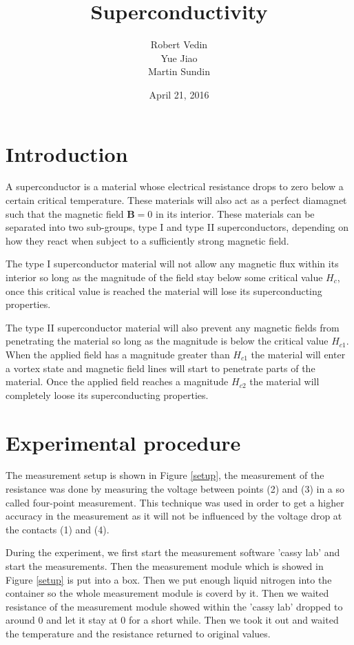 \documentclass[a4paper]{article}
\title{Superconductivity}
\author{Robert Vedin \\ Yue Jiao \\ Martin Sundin}
\date{April 21, 2016}
\begin{document}
\maketitle



\section{Introduction}

A superconductor is a material whose electrical resistance drops to zero below a certain critical temperature. These materials will also act as a perfect diamagnet such that the magnetic field $\mathbf{B} = 0$ in its interior. These materials can be separated into two sub-groups, type I and type II superconductors, depending on how they react when subject to a sufficiently strong magnetic field.

The type I superconductor material will not allow any magnetic flux within its interior so long as the magnitude of the field stay below some critical value $H_c$, once this critical value is reached the material will lose its superconducting properties.

The type II superconductor material will also prevent any magnetic fields from penetrating the material so long as the magnitude is below the critical value $H_{c1}$. When the applied field has a magnitude greater than $H_{c1}$ the material will enter a vortex state and magnetic field lines will start to penetrate parts of the material. Once the applied field reaches a magnitude $H_{c2}$ the material will completely loose its superconducting properties.

\section{Experimental procedure}
The measurement setup is shown in Figure \ref{setup}, the measurement of the resistance was done by measuring the voltage between points (2) and (3) in a so called four-point measurement. This technique was used in order to get a higher accuracy in the measurement as it will not be influenced by the voltage drop at the contacts (1) and (4).

During the experiment, we first start the measurement software 'cassy lab' and start the measurements. Then the measurement module which is showed in Figure \ref{setup} is put into a box. Then we put enough liquid nitrogen into the container so the whole measurement module is coverd by it. Then we waited resistance of the measurement module showed within the 'cassy lab' dropped to around $0$ and let it stay at $0$ for a short while. Then we took it out and waited the temperature and the resistance returned to original values. 
\end{document}
